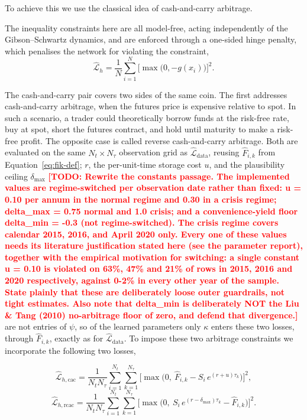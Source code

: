 \documentclass[11pt, a4paper]{article}
\newcommand{\todo}[1]{\textcolor{red}{\textbf{[TODO: #1]}}}
\begin{document}
To achieve this we use the classical idea of cash-and-carry arbitrage.

The inequality constraints here are all model-free, acting independently of the Gibson–Schwartz dynamics, and are enforced through a one-sided hinge penalty, which penalises the network for violating the constraint,
\begin{equation}
\hat{\mathcal{L}}_h = \frac{1}{N} \sum_{i=1}^{N}
\big[ \max\!\big(0, -g(x_i)\big) \big]^2.
\label{eq:hinge}
\end{equation}

The cash-and-carry pair covers two sides of the same coin. The first addresses cash-and-carry arbitrage, when the futures price is expensive relative to spot. In such a scenario, a trader could theoretically borrow funds at the risk-free rate, buy at spot, short the futures contract, and hold until maturity to make a risk-free profit. The opposite case is called reverse cash-and-carry arbitrage. Both are evaluated on the same $N_t \times N_\tau$ observation grid as $\hat{\mathcal{L}}_{\text{data}}$, reusing $\hat{F}_{i,k}$ from Equation~\ref{eq:fik-def}; $r$, the per-unit-time storage cost $u$, and the plausibility ceiling $\delta_{\max}$
\todo{Rewrite the constants passage. The implemented values are regime-switched
  per observation date rather than fixed: u = 0.10 per annum in the normal
  regime and 0.30 in a crisis regime; delta\_max = 0.75 normal and 1.0 crisis;
  and a convenience-yield floor delta\_min = -0.3 (not regime-switched). The
  crisis regime covers calendar 2015, 2016, and April 2020 only. Every one of
  these values needs its literature justification stated here (see the parameter
  report), together with the empirical motivation for switching: a single
  constant u = 0.10 is violated on 63\%, 47\% and 21\% of rows in 2015, 2016 and
  2020 respectively, against 0-2\% in every other year of the sample. State
  plainly that these are deliberately loose outer guardrails, not tight
  estimates. Also note that delta\_min is deliberately NOT the Liu \& Tang (2010)
  no-arbitrage floor of zero, and defend that divergence.}
are not entries of $\psi$, so of the learned parameters only $\kappa$ enters these two losses, through $\hat{F}_{i,k}$, exactly as for $\hat{\mathcal{L}}_{\text{data}}$. To impose these two arbitrage constraints we incorporate the following two losses,

\begin{equation}
\hat{\mathcal{L}}_{h,\text{cac}} = \frac{1}{N_t N_\tau} \sum_{i=1}^{N_t} \sum_{k=1}^{N_\tau}
\Big[ \max\!\Big( 0,\ \hat{F}_{i,k} - S_i\, e^{(r+u)\tau_k} \Big)
\Big]^2,
\label{eq:cac-loss}
\end{equation}
\begin{equation}
\hat{\mathcal{L}}_{h,\text{rcac}} = \frac{1}{N_t N_\tau} \sum_{i=1}^{N_t} \sum_{k=1}^{N_\tau}
\Big[ \max\!\Big( 0,\ S_i\, e^{(r - \delta_{\max})\tau_k}
- \hat{F}_{i,k} \Big) \Big]^2.
\label{eq:rcac-loss}
\end{equation}
\end{document}

